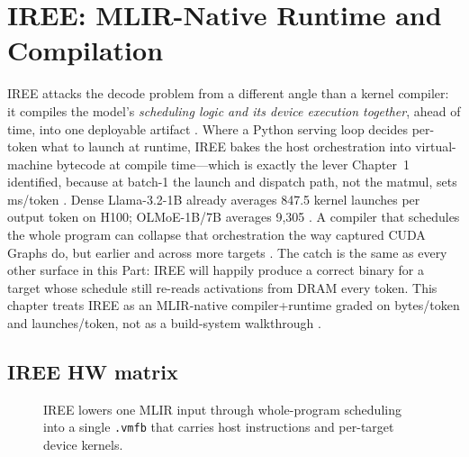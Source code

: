 \chapter{IREE: MLIR-Native Runtime and Compilation}
\label{chap:ch18}

IREE attacks the decode problem from a different angle than a kernel compiler: it compiles the model's \emph{scheduling logic and its device execution together}, ahead of time, into one deployable artifact \citep{iree2024}. Where a Python serving loop decides per-token what to launch at runtime, IREE bakes the host orchestration into virtual-machine bytecode at compile time---which is exactly the lever Chapter~1 identified, because at batch-1 the launch and dispatch path, not the matmul, sets ms/token \citep{taxbreak2026,patel2025llminference}. Dense Llama-3.2-1B already averages 847.5 kernel launches per output token on H100; OLMoE-1B/7B averages 9{,}305 \citep{taxbreak2026}. A compiler that schedules the whole program can collapse that orchestration the way captured CUDA Graphs do, but earlier and across more targets \citep{memoryfloor2026,nvidia2024cudagraphs}.
The catch is the same as every other surface in this Part: IREE will happily produce a correct binary for a target whose schedule still re-reads activations from DRAM every token. This chapter treats IREE as an MLIR-native compiler+runtime graded on bytes/token and launches/token, not as a build-system walkthrough \citep{dlbook}.

\section{IREE HW matrix}
\label{sec:ch18_iree_hw_matrix}


\begin{figure}[t]
\centering
{}
\caption{IREE lowers one MLIR input through whole-program scheduling into a single \texttt{.vmfb} that carries host instructions and per-target device kernels.}
\label{fig:iree_hw_matrix_pipeline}
\end{figure}

